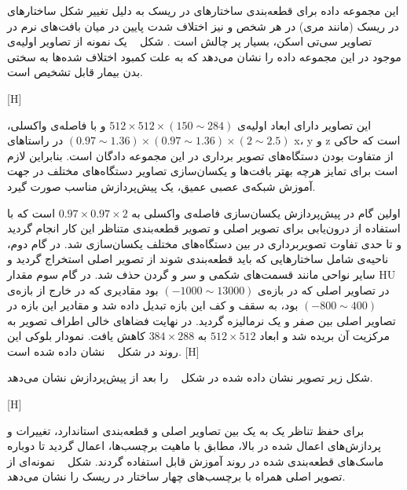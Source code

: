 این مجموعه داده برای قطعه‌بندی ساختارهای در ریسک به دلیل تغییر شکل ساختار‌های در ریسک (مانند مری) در هر شخص و نیز اختلاف شدت پایین در میان بافت‌های نرم در تصاویر سی‌تی اسکن، بسیار پر چالش است . شکل ~ یک نمونه از تصاویر اولیه‌ی موجود در این مجموعه داده را نشان می‌دهد که به علت کمبود اختلاف شده‌ها به سختی بدن بیمار قابل تشخیص است. 

[H]

این تصاویر دارای ابعاد اولیه‌ی $512\times512\times(150\sim 284)$ و با فاصله‌ی واکسلی،
 $(0.97\sim1.36)\times(0.97\sim1.36)\times(2\sim2.5)$
 در راستاهای x، y و z است که حاکی از متفاوت بودن دستگاه‌های تصویر برداری در این مجموعه دادگان است. بنابراین لازم است برای تمایز هرچه بهتر بافت‌ها و یکسان‌سازی تصاویر دستگاه‌های مختلف در جهت آموزش شبکه‌ی عصبی عمیق، یک پیش‌پردازش مناسب صورت گیرد.
 
اولین گام در پیش‌پردازش یکسان‌سازی فاصله‌ی واکسلی به $0.97\times0.97\times2$ است که با استفاده از درون‌یابی برای تصویر اصلی و تصویر قطعه‌بندی متناظر این کار انجام گردید و تا حدی تفاوت تصویربرداری در بین دستگاه‌های مختلف یکسان‌سازی شد. در گام دوم، ناحیه‌ی شامل ساختارهایی که باید قطعه‌بندی شوند از تصویر اصلی استخراج گردید و سایر نواحی مانند قسمت‌های شکمی و سر و گردن حذف شد. در گام سوم مقدار HU در تصاویر اصلی که در بازه‌ی $(-1000\sim 13000)$ بود مقادیری که در خارج از بازه‌ی $(-800\sim 400)$ بود، به سقف و کف این بازه تبدیل داده شد و مقادیر این بازه در تصاویر اصلی بین صفر و یک نرمالیزه گردید. در نهایت فضاهای خالی اطراف تصویر به مرکزیت آن بریده شد و ابعاد $512\times512$ به $384\times288$ کاهش یافت. نمودار بلوکی این روند در شکل ~ نشان داده شده است.
[H]

شکل زیر تصویر نشان داده شده در شکل ~ را بعد از پیش‌پردازش نشان می‌دهد.

[H]

برای حفظ تناظر یک به یک بین تصاویر اصلی و قطعه‌بندی استاندارد، تغییرات و پردازش‌های اعمال شده در بالا، مطابق با ماهیت برچسب‌ها، اعمال گردید تا دوباره ماسک‌های قطعه‌بندی شده در روند آموزش قابل استفاده گردند. شکل ~ نمونه‌ای از تصویر اصلی همراه با برچسب‌های چهار ساختار در ریسک را نشان می‌دهد.

